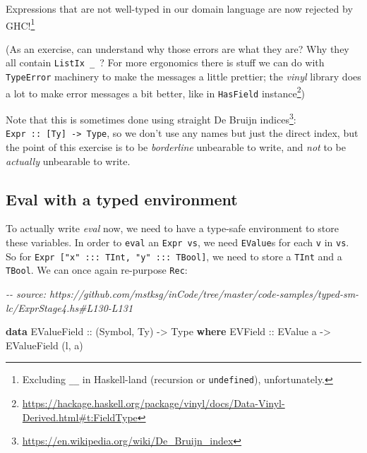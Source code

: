 \documentclass[]{article}
\newenvironment{Shaded}{}{}
\newcommand{\CommentTok}[1]{\textcolor[rgb]{0.38,0.63,0.69}{\textit{#1}}}
\newcommand{\DataTypeTok}[1]{\textcolor[rgb]{0.56,0.13,0.00}{#1}}
\newcommand{\KeywordTok}[1]{\textcolor[rgb]{0.00,0.44,0.13}{\textbf{#1}}}
\newcommand{\NormalTok}[1]{#1}
\newcommand{\OtherTok}[1]{\textcolor[rgb]{0.00,0.44,0.13}{#1}}
\renewcommand{\href}[2]{#2\footnote{\url{#1}}}
\begin{document}
Expressions that are not well-typed in our domain language are now rejected by
GHC!\footnote{Excluding \texttt{\_\textbar{}\_} in Haskell-land (recursion or
  \texttt{undefined}), unfortunately.}

(As an exercise, can understand why those errors are what they are? Why they all
contain \texttt{ListIx\ \_\ \textquotesingle{}{[}{]}}? For more ergonomics there
is stuff we can do with \texttt{TypeError} machinery to make the messages a
little prettier; the \emph{vinyl} library does a lot to make error messages a
bit better, like in \texttt{HasField}
\href{https://hackage.haskell.org/package/vinyl/docs/Data-Vinyl-Derived.html\#t:FieldType}{instance})

Note that this is sometimes done using straight
\href{https://en.wikipedia.org/wiki/De_Bruijn_index}{De Bruijn indices}:
\texttt{Expr\ ::\ {[}Ty{]}\ -\textgreater{}\ Type}, so we don't use any names
but just the direct index, but the point of this exercise is to be
\emph{borderline} unbearable to write, and \emph{not} to be \emph{actually}
unbearable to write.

\subsection{Eval with a typed environment}\label{eval-with-a-typed-environment}

To actually write \emph{eval} now, we need to have a type-safe environment to
store these variables. In order to \texttt{eval} an \texttt{Expr\ vs}, we need
\texttt{EValue}s for each \texttt{v} in \texttt{vs}. So for
\texttt{Expr\ {[}"x"\ :::\ TInt,\ "y"\ :::\ TBool{]}}, we need to store a
\texttt{TInt} and a \texttt{TBool}. We can once again re-purpose \texttt{Rec}:

\begin{Shaded}
\begin{Highlighting}[]
\CommentTok{{-}{-} source: https://github.com/mstksg/inCode/tree/master/code{-}samples/typed{-}sm{-}lc/ExprStage4.hs\#L130{-}L131}

\KeywordTok{data} \DataTypeTok{EValueField}\OtherTok{ ::}\NormalTok{ (}\DataTypeTok{Symbol}\NormalTok{, }\DataTypeTok{Ty}\NormalTok{) }\OtherTok{{-}\textgreater{}} \DataTypeTok{Type} \KeywordTok{where}
  \DataTypeTok{EVField}\OtherTok{ ::} \DataTypeTok{EValue}\NormalTok{ a }\OtherTok{{-}\textgreater{}} \DataTypeTok{EValueField}\NormalTok{ \textquotesingle{}(l, a)}
\end{Highlighting}
\end{Shaded}
\end{document}
